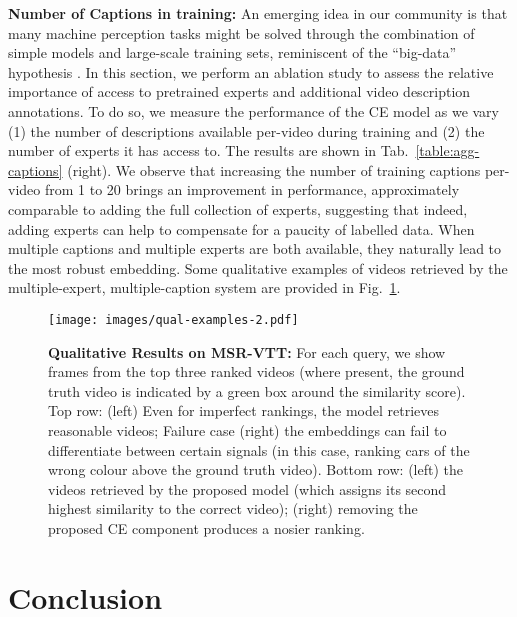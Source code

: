 \documentclass{bmvc2k}
\begin{document}
\noindent \textbf{Number of Captions in training:} An emerging idea in our community is that many machine perception tasks might be solved through the combination of simple models and large-scale training sets, reminiscent of the ``big-data'' hypothesis \cite{halevy2009unreasonable}. In this section, we perform an ablation study to assess the relative importance of access to pretrained experts and additional video description annotations.  To do so, we measure the performance of the CE model as we vary (1) the number of descriptions available per-video during training and (2) the number of experts it has access to. The results are shown in Tab.~\ref{table:agg-captions} (right). We observe that increasing the number of training captions per-video from 1 to 20 brings an improvement in performance, approximately comparable to adding the full collection of experts, suggesting that indeed, adding experts can help to compensate for a paucity of labelled data. When multiple captions and multiple experts are both available, they naturally lead to the most robust embedding.  Some qualitative examples of videos retrieved by the multiple-expert, multiple-caption system are provided in Fig.~\ref{fig:qual-examples}. 


\begin{figure}[ht!]
\begin{center}
\vspace{-0.1cm}
\texttt{[image: images/qual-examples-2.pdf]}
\end{center}
\vspace{-1cm}
\hspace{-6mm}
  \caption{\textbf{Qualitative Results on MSR-VTT:} For each query, we show frames from the top three ranked videos (where present, the ground truth video is indicated by a green box around the similarity score). Top row: (left) Even for imperfect rankings, the model retrieves reasonable videos; Failure case (right) the embeddings can fail to differentiate between certain signals (in this case, ranking cars of the wrong colour above the ground truth video). Bottom row: (left) the videos retrieved by the proposed model (which assigns its second highest similarity to the correct video); (right) removing the proposed CE component produces a nosier ranking. \label{fig:qual-examples}}
  \vspace{-0.8cm}
\end{figure}

\section{Conclusion}
\end{document}
